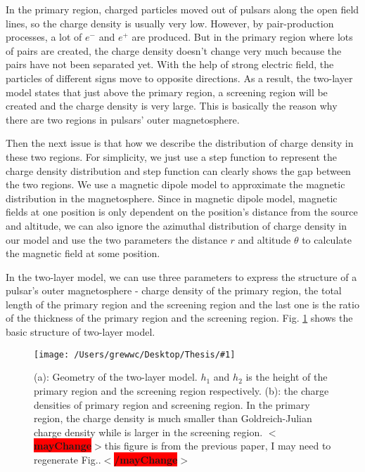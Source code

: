 \documentclass[12pt]{report}
\newcommand{\mycaption}[1]{\protect \caption{#1}}
\newcommand{\singleFig}[3]{
 \begin{figure}[!ht]
  \centering
  \texttt{[image: /Users/grewwc/Desktop/Thesis/\#1]}
  \mycaption{#3}
 \label{fig: #1}
 \end{figure}
}
\newcommand{\mayChange}[1]{
  $<$\colorbox{red}{\textbf{mayChange}}$>$#1$<$\colorbox{red}{\textbf{/mayChange}}$>$
}
\begin{document}
        In the primary region, charged particles moved out of pulsars along the open field 
        lines, 
        so the charge density is usually very low. 
        However, by pair-production processes, a lot of $e^{-}$ and $e^{+}$ are produced. 
        But in the primary region where lots of pairs are created, the charge density 
        doesn't 
        change very much because the pairs have not been separated yet. With the help of 
        strong 
        electric field, the particles of different signs move to opposite directions. 
        As a result, the two-layer model states that just above the primary region, a 
        screening 
        region will be created and the charge density is very large. This is basically the reason why 
        there are two regions in pulsars' outer magnetosphere.

        Then the next issue is that how we describe the distribution of charge density in these two regions. 
        For simplicity, we just use a step function to represent the charge density distribution and step function 
        can clearly shows the gap between the two regions. We use a magnetic dipole model to approximate the 
        magnetic distribution in the magnetosphere. Since in magnetic dipole model, magnetic fields at one 
        position is only dependent on the position's distance from the source and altitude, we can 
        also ignore the azimuthal distribution of charge density in our model and use the two parameters
        the distance $r$ and altitude $\theta$ to calculate the magnetic field at some position.

        In the two-layer model, we can use three parameters to express the structure of a pulsar's outer 
        magnetosphere - charge density of the primary region, the total length of the primary region and the 
        screening region and the last one is the ratio of the thickness of the primary region and the 
        screening region. Fig. \ref{fig: charge_density} shows the basic structure of two-layer model. 

        \singleFig{charge_density}{0.6}{(a): Geometry of the two-layer model. $h_{1}$ and $h_{2}$ is the height
        of the primary region and the screening region respectively. (b): the charge densities of primary region and 
        screening region. In the primary region, the charge density is much smaller than Goldreich-Julian charge density
        while is larger in the screening region. \mayChange{this figure is from the previous paper, I may need to 
        regenerate Fig..}}
\end{document}
